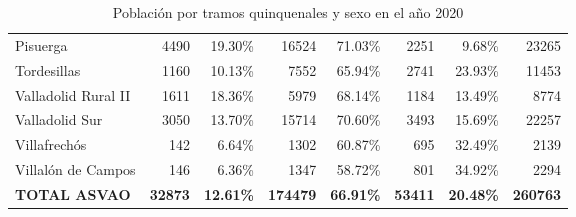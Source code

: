 \begin{table}[H]
\begin{tabular}{lrrrrrrr}
        Pisuerga                 & 4490           & 19.30\%          & 16524           & 71.03\%          & 2251           & 9.68\%           & 23265            \\
        Tordesillas              & 1160           & 10.13\%          & 7552            & 65.94\%          & 2741           & 23.93\%          & 11453            \\
        Valladolid Rural II      & 1611           & 18.36\%          & 5979            & 68.14\%          & 1184           & 13.49\%          & 8774             \\
        Valladolid Sur           & 3050           & 13.70\%          & 15714           & 70.60\%          & 3493           & 15.69\%          & 22257            \\
        Villafrechós             & 142            & 6.64\%           & 1302            & 60.87\%          & 695            & 32.49\%          & 2139             \\
        Villalón de Campos       & 146            & 6.36\%           & 1347            & 58.72\%          & 801            & 34.92\%          & 2294             \\
        \midrule
        \textbf{TOTAL ASVAO}     & \textbf{32873} & \textbf{12.61\%} & \textbf{174479} & \textbf{66.91\%} & \textbf{53411} & \textbf{20.48\%} & \textbf{260763} \\
        \bottomrule
    \end{tabular}
    \caption{Población por tramos quinquenales y sexo en el año 2020}
    \label{tab:poblacion}
\end{table}




